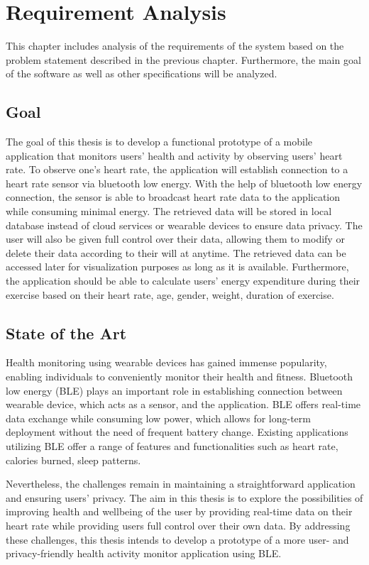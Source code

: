 \chapter{Requirement Analysis}
This chapter includes analysis of the requirements of the system based on the problem statement described in the previous chapter. Furthermore, the main goal of the software as well as other specifications will be analyzed.

\section{Goal}
The goal of this thesis is to develop a functional prototype of a mobile application that monitors users' health and activity by observing users' heart rate. To observe one's heart rate, the application will establish connection to a heart rate sensor via bluetooth low energy.
With the help of bluetooth low energy connection, the sensor is able to broadcast heart rate data to the application while consuming minimal energy.
The retrieved data will be stored in local database instead of cloud services or wearable devices to ensure data privacy. The user will also be given full control over their data, allowing them to modify or delete their data according to their will at anytime.
The retrieved data can be accessed later for visualization purposes as long as it is available. Furthermore, the application should be able to calculate users' energy expenditure during their exercise based on their heart rate, age, gender, weight, duration of exercise.

\section{State of the Art}
Health monitoring using wearable devices has gained immense popularity, enabling individuals to conveniently monitor their health and fitness. Bluetooth low energy (BLE) plays an important role in establishing connection between wearable device, which acts as a sensor, and the application. 
BLE offers real-time data exchange while consuming low power, which allows for long-term deployment without the need of frequent battery change. \cite{strey2013ble}
Existing applications utilizing BLE offer a range of features and functionalities such as heart rate, calories burned, sleep patterns.

Nevertheless, the challenges remain in maintaining a straightforward application and ensuring users' privacy. The aim in this thesis is to explore the possibilities of improving health and wellbeing of the user by providing real-time data on their heart rate while providing users full control over their own data.
By addressing these challenges, this thesis intends to develop a prototype of a more user- and privacy-friendly health activity monitor application using BLE.
\newpage

